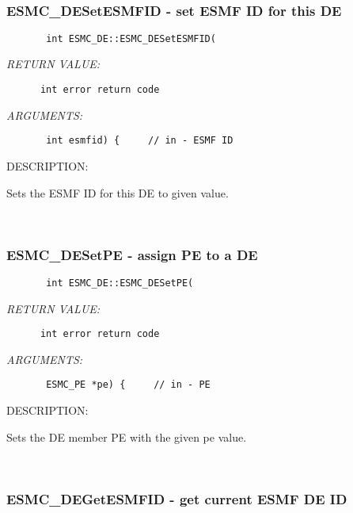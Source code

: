 \mbox{}\hrulefill\ 
 
\subsubsection{ESMC\_DESetESMFID - set ESMF ID for this DE}


  
\begin{verbatim}       int ESMC_DE::ESMC_DESetESMFID(\end{verbatim}{\em RETURN VALUE:}
\begin{verbatim}      int error return code\end{verbatim}{\em ARGUMENTS:}
\begin{verbatim}       int esmfid) {     // in - ESMF ID\end{verbatim}
{\sf DESCRIPTION:\\ }


       Sets the ESMF ID for this DE to given value.
   
 
\mbox{}\hrulefill\ 
 
\subsubsection{ESMC\_DESetPE - assign PE to a DE}


  
\begin{verbatim}       int ESMC_DE::ESMC_DESetPE(\end{verbatim}{\em RETURN VALUE:}
\begin{verbatim}      int error return code\end{verbatim}{\em ARGUMENTS:}
\begin{verbatim}       ESMC_PE *pe) {     // in - PE\end{verbatim}
{\sf DESCRIPTION:\\ }


       Sets the DE member PE with the given pe value.
   
 
\mbox{}\hrulefill\ 
 
\subsubsection{ESMC\_DEGetESMFID - get current ESMF DE ID}


